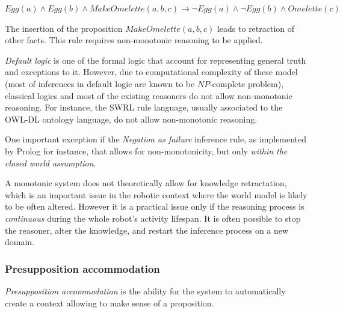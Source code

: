 \documentclass[a4paper, twocolumn]{article}
\begin{document}
$Egg(a) \wedge Egg(b) \wedge MakeOmelette(a, b, c) \to \lnot Egg(a) \wedge
\lnot Egg(b) \wedge Omelette(c)$

The insertion of the proposition $MakeOmelette(a, b, c)$ leads to retraction of
other facts. This rule requires non-monotonic reasoning to be applied.

\emph{Default logic} is one of the formal logic that account for representing
general truth and exceptions to it. However, due to computational complexity of
these model (most of inferences in default logic are known to be $NP$-complete
problem), classical logics and most of the existing reasoners do not allow
non-monotonic reasoning. For instance, the SWRL rule language, usually
associated to the OWL-DL ontology language, do not allow non-monotonic
reasoning.


One important exception if the \emph{Negation as failure} inference rule, as
implemented by {\sc Prolog} for instance, that allows for non-monotonicity, but
only \emph{within the closed world assumption}.


A monotonic system does not theoretically allow for knowledge retractation,
which is an important issue in the robotic context where the world model is
likely to be often altered.  However it is a practical issue only if the
reasoning process is \emph{continuous} during the whole robot's activity
lifespan. It is often possible to stop the reasoner, alter the knowledge, and
restart the inference process on a new domain.



\subsubsection{Presupposition accommodation}
\label{sect|presupposition-accomodation}

\emph{Presupposition accommodation} is the ability for the system to
automatically create a context allowing to make sense of a proposition.
\end{document}
